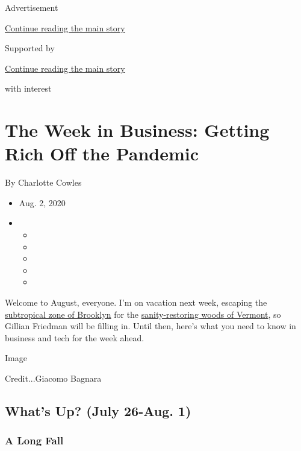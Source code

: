 Advertisement

\protect\hyperlink{after-top}{Continue reading the main story}

Supported by

\protect\hyperlink{after-sponsor}{Continue reading the main story}

with interest

\hypertarget{the-week-in-business-getting-rich-off-the-pandemic}{%
\section{The Week in Business: Getting Rich Off the
Pandemic}\label{the-week-in-business-getting-rich-off-the-pandemic}}

By Charlotte Cowles

\begin{itemize}
\item
  Aug. 2, 2020
\item
  \begin{itemize}
  \item
  \item
  \item
  \item
  \item
  \end{itemize}
\end{itemize}

Welcome to August, everyone. I'm on vacation next week, escaping the
\href{https://www.nytimes3xbfgragh.onion/2020/07/24/nyregion/climate-change-nyc.html}{subtropical
zone of Brooklyn} for the
\href{https://www.nytimes3xbfgragh.onion/2020/07/13/travel/vermont-drone-photographs.html}{sanity-restoring
woods of Vermont}, so Gillian Friedman will be filling in. Until then,
here's what you need to know in business and tech for the week ahead.

Image

Credit...Giacomo Bagnara

\hypertarget{whats-up-july-26-aug-1}{%
\subsection{What's Up? (July 26-Aug. 1)}\label{whats-up-july-26-aug-1}}

\hypertarget{a-long-fall}{%
\subsubsection{A Long Fall}\label{a-long-fall}}

